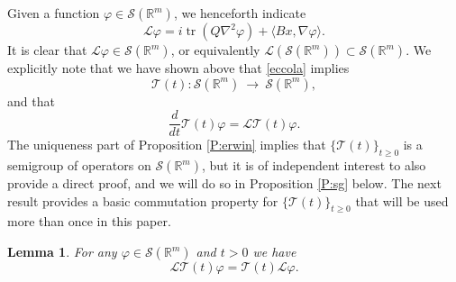 \documentclass[11pt,a4paper]{amsart}
\def \vf{\varphi}
\def \So {\mathscr{S}(\Rm)}
\newcommand{\Rm}{\mathbb R^m}
\numberwithin{equation}{section}
\newtheorem{lemma}[theorem]{Lemma}
\numberwithin{equation}{section}
\begin{document}
Given a function $\vf\in \mathscr S(\Rm)$, we henceforth indicate 
\begin{equation}\label{sL}
\mathscr L \vf = i \operatorname{tr}(Q \nabla^2 \vf) +  \langle B x,\nabla \vf\rangle. 
\end{equation}
It is clear that $\mathscr L \vf\in \mathscr S(\Rm)$, or equivalently $\mathscr L(\So)\subset \So$. We explicitly note that we have shown above that \eqref{eccola} implies
\begin{equation}\label{eccolina}
\mathcal T(t) : \So\ \longrightarrow\ \So,
\end{equation}
and that
\begin{equation}\label{dt}
\frac{d}{dt} \mathcal T(t)\vf = \mathscr L \mathcal T(t) \vf.
\end{equation} 
The uniqueness part of Proposition \ref{P:erwin} implies that $\{\mathcal T(t)\}_{t\ge 0}$ is a semigroup of operators on $\So$, but it is of independent interest to also provide a direct proof, and we will do so in Proposition \ref{P:sg} below. The next result provides a basic commutation property for $\{\mathcal T(t)\}_{t\ge 0}$ that will be used more than once in this paper. 

\begin{lemma}\label{L:mapTt}
For any $\vf\in \So$ and $t>0$ we have 
\[
\mathscr L \mathcal T(t) \vf = \mathcal T(t) \mathscr L  \vf.
\]
\end{lemma}
\end{document}
